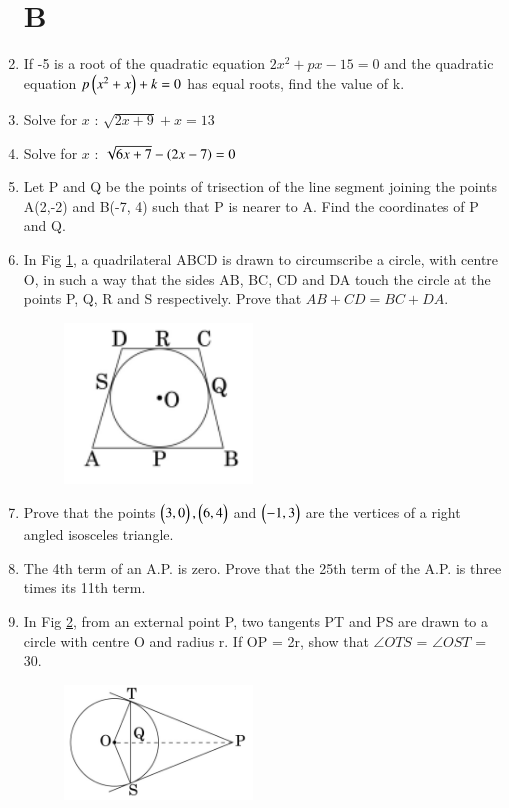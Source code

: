 \documentclass[book,11pt,onecolumn]{IEEEtran}
\begin{document}
\begin{enumerate}
\section{\textbf{B}}
\item If -5 is a root of the quadratic equation $2x^2+px-15=0$ and the quadratic equation $p\left(x^2+x\right)+k=0 $ has equal roots, find the value of k. \\
\item Solve for $x$ : $\sqrt{2x+9} + x = 13$ \\
\item Solve for $x$ : $\sqrt{6x+7}-\left(2x-7\right)= 0$ \\
\item  Let P and Q be the points of trisection of the line segment joining the points A(2,-2) and B(-7, 4) such that P is nearer to A. Find the coordinates of P and Q.\\
\item  In Fig \ref{figure_2}, a quadrilateral ABCD is drawn to circumscribe a circle, with centre O, in such a way that the sides AB, BC, CD and DA touch the circle at the points P, Q, R and S respectively. Prove that $ AB + CD= BC + DA $.\\
	\begin{figure}[H]
\centering
      \includegraphics[width=5cm]{figs/2.png}
      \caption{}
      \label{figure_2}
\end{figure} 
\item  Prove that the points $\begin{pmatrix}3,0\end{pmatrix}, \begin{pmatrix}6, 4\end{pmatrix}$ and $\begin{pmatrix}-1, 3\end{pmatrix}$ are the vertices of a right angled isosceles triangle.\\
\item  The 4th term of an A.P. is zero. Prove that the 25th term of the A.P. is three times its 11th term.\\
\item  In Fig \ref{figure_3}, from an external point P, two tangents PT and PS are drawn to a circle with centre O and radius r. If OP = 2r, show that $\angle OTS $ = $\angle OST $ = 30\degree.
\begin{figure}[H]
\centering
\includegraphics[width=5cm]{figs/3.png}
\caption{}
      \label{figure_3}
   \end{figure} 

\end{enumerate}
\end{document}
